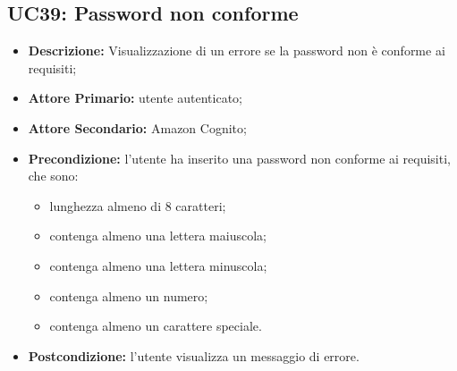 \subsection{UC39: Password non conforme}
\label{sec:UC39}
\begin{itemize}
    \item \textbf{Descrizione:} Visualizzazione di un errore se la password non è conforme ai requisiti;
    \item \textbf{Attore Primario:} utente autenticato;
    \item \textbf{Attore Secondario:} Amazon Cognito;
    \item \textbf{Precondizione:} l'utente ha inserito una password non conforme ai requisiti, che sono:
          \begin{itemize}
              \item lunghezza almeno di 8 caratteri;
              \item contenga almeno una lettera maiuscola;
              \item contenga almeno una lettera minuscola;
              \item contenga almeno un numero;
              \item contenga almeno un carattere speciale.
          \end{itemize}
    \item \textbf{Postcondizione:} l'utente visualizza un messaggio di errore.
\end{itemize}